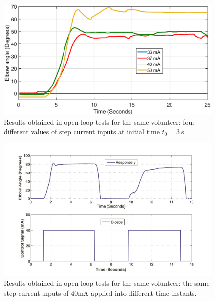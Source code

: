 \documentclass[review]{elsarticle}
\begin{document}
%
\begin{figure}[!htb]
\begin{center}
\includegraphics[width=12cm]{fig3.eps}
\caption{Results obtained in open-loop tests for the same volunteer: four different values of step current inputs at initial time
$t_0=3\ $s.}
\label{fig5}
\end{center}
\end{figure}
%
\begin{figure}[!htb]
\begin{center}
\includegraphics[width=13cm]{MalhaAberta2}
\caption{Results obtained in open-loop tests for the same volunteer: the same step current inputs of $40$mA applied into different
time-instants.}
\label{fig50}
\end{center}
\end{figure}
\end{document}
